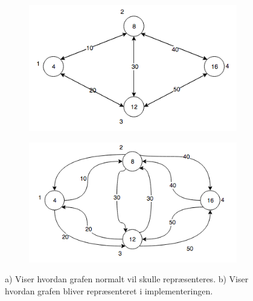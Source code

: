 \documentclass[a4paper,10pt,titlepage]{article}
\begin{document}
\begin{figure}[H]
\centering
\begin{subfigure}{.5\textwidth}
  \centering
  \includegraphics[width=1\linewidth]{Billeder/GraphBidirectionalPropSimple.png}
  \caption{}
\end{subfigure}%
\begin{subfigure}{.5\textwidth}
  \centering
  \includegraphics[width=1\linewidth]{Billeder/GraphBidirectionalProps.png}
  \caption{}
\end{subfigure}
\caption{a) Viser hvordan grafen normalt vil skulle repræsenteres. b) Viser hvordan grafen bliver repræsenteret i implementeringen.}
\end{figure}
\end{document}
